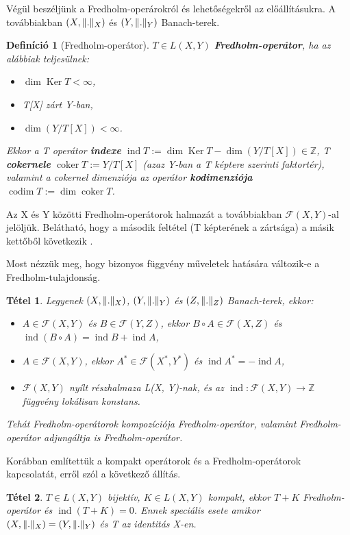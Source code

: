 \documentclass[oneside, titlepage, 12pt, a4paper]{report}
\newtheorem{theorem}{Tétel}[section]
\newtheorem{definition}{Definíció}[section]
\DeclareMathOperator{\Ker}{Ker}	%
\DeclareMathOperator{\coker}{coker}	%
\DeclareMathOperator{\codim}{codim}	%
\DeclareMathOperator{\ind}{ind}	%
\DeclarePairedDelimiter\norm{\lVert}{\rVert}	%
\begin{document}
Végül beszéljünk a Fredholm-operárokról és lehetőségekről az előállításukra. A továbbiakban $(X, \norm{.}_X)$ és $(Y, \norm{.}_Y)$ Banach-terek.
\begin{definition}[Fredholm-operátor]
$T \in L(X, Y)$ \textbf{Fredholm-operátor}, ha az alábbiak teljesülnek:
\begin{itemize}
\item
$\dim \Ker T < \infty$,
\item
T[X] zárt Y-ban,
\item
$\dim (Y / T[X]) < \infty$.
\end{itemize} %
Ekkor a T operátor \textbf{indexe} $\ind T := \dim \Ker T - \dim (Y / T[X]) \in \mathbb{Z}$, T \textbf{cokernele} $\coker T := Y / T[X]$ (azaz Y-ban a T képtere szerinti faktortér), valamint a cokernel dimenziója az operátor \textbf{kodimenziója} $\codim T := \dim \coker T$. \cite{faktorter, FcNotex, lectures16and17, diffun2}
\end{definition}
Az X és Y közötti Fredholm-operátorok halmazát a továbbiakban $\mathcal{F}(X, Y)$-al jelöljük. Belátható, hogy a második feltétel (T képterének a zártsága) a másik kettőből következik \cite{lectures16and17, diffun2}. \par

Most nézzük meg, hogy bizonyos függvény műveletek hatására változik-e a Fredholm-tulajdonság.	%
\begin{theorem}
Legyenek $(X, \norm{.}_X)$, $(Y, \norm{.}_Y)$ és $(Z, \norm{.}_Z)$ Banach-terek, ekkor:
\begin{itemize}
\item
$A \in \mathcal{F}(X, Y)$ és $B \in \mathcal{F}(Y, Z)$, ekkor $B \circ A \in \mathcal{F}(X, Z)$ és $ \ind (B \circ A) = \ind B + \ind A$,
\item
$A \in \mathcal{F}(X, Y)$, ekkor $A^* \in \mathcal{F}(X^*, Y^*)$ és $\ind A^* = - \ind A$,
\item
$\mathcal{F}(X, Y)$ nyílt részhalmaza L(X, Y)-nak, és az $\ind : \mathcal{F}(X, Y) \rightarrow \mathbb{Z}$ függvény lokálisan konstans.
\end{itemize}
Tehát Fredholm-operátorok kompozíciója Fredholm-operátor, valamint Fredholm-operátor adjungáltja is Fredholm-operátor. \cite{FcNotex, diffun2}
\end{theorem}

Korábban említettük a kompakt operátorok és a Fredholm-operátorok kapcsolatát, erről szól a következő állítás.
\begin{theorem}
$T \in L(X, Y)$ bijektív, $K \in L(X, Y)$ kompakt, ekkor $T + K$ Fredholm-operátor és $\ind(T + K) = 0$. Ennek speciális esete amikor $(X, \norm{.}_X) = (Y, \norm{.}_Y)$ és T az identitás X-en. \cite{FcNotex,diffun2}
\end{theorem}
\end{document}
